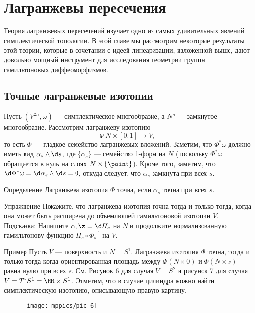 \chapter{Лагранжевы пересечения}

Теория лагранжевых пересечений изучает одно из самых удивительных явлений симплектической топологии.
В этой главе мы рассмотрим некоторые результаты этой теории, которые в сочетании с идеей линеаризации, изложенной выше, дают довольно мощный инструмент для исследования геометрии группы гамильтоновых диффеоморфизмов.

\section{Точные лагранжевые изотопии}
Пусть $(V^{2n}, \omega)$ --- симплектическое многообразие, а $N^n$ --- замкнутое многообразие.
Рассмотрим лагранжеву изотопию
\[\Phi\: N \times [0, 1] \to V,\]
то есть $\Phi$ --- гладкое семейство лагранжевых вложений.
Заметим, что $\Phi^\ast \omega$ должно иметь вид $\alpha_s \wedge \d s$, где $\{\alpha_s\}$ --- семейство 1-форм на $N$ (поскольку $\Phi^\ast \omega$ обращается в нуль на слоях $N \times \{\point\}$).
Кроме того, заметим, что $\d \Phi^\ast \omega = \d \alpha_s \wedge \d s = 0$, откуда следует, что $\alpha_s$ замкнута при всех $s$.

\begin{thm*}{Определение}
Лагранжева изотопия $\Phi$ точна, если $\alpha_s$ точна при всех $s$.
\end{thm*}

\begin{thm}{Упражнение}\label{6.1.A}
Покажите, что лагранжева изотопия точна тогда и только тогда, когда она может быть расширена до объемлющей гамильтоновой изотопии $V$.
Подсказка: Напишите $\alpha_s \z= \d  H_s$ на $N$ и продолжите нормализованную гамильтонову функцию $H_s \circ \Phi^{-1}_s$ на $V$.
\end{thm}

\begin{thm*}{Пример}
Пусть $V$ --- поверхность и $N = S^1$.
Лагранжева изотопия $\Phi$ точна, тогда и только тогда когда ориентированная площадь между $\Phi (N \times {0})$ и $\Phi (N \times {s})$ равна нулю при всех $s$.
См. Рисунок 6 для случая $V = S^2$ и рисунок 7 для случая $V = T^\ast S^1 = \RR \times S^1$.
Отметим, что в случае цилиндра можно найти симплектическую изотопию, описывающую правую картину.
\end{thm*}

\begin{figure}[ht!]
\vskip-0mm
\centering
\texttt{[image: mppics/pic-6]}
\caption{}\label{pic-6}
\vskip0mm
\end{figure}

